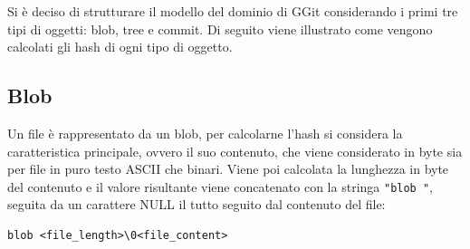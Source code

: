 Si è deciso di strutturare il modello del dominio di GGit considerando i primi tre tipi di oggetti: blob, tree e commit.
Di seguito viene illustrato come vengono calcolati gli hash di ogni tipo di oggetto.

\subsection{Blob}
Un file è rappresentato da un blob, per calcolarne l'hash si considera la caratteristica principale, ovvero il suo contenuto, che viene considerato in byte sia per file in puro testo ASCII che binari.
Viene poi calcolata la lunghezza in byte del contenuto e il valore risultante viene concatenato con la stringa \texttt{"blob "}, seguita da un carattere NULL il tutto seguito dal contenuto del file:
\begin{verbatim}
blob <file_length>\0<file_content>
\end{verbatim}

